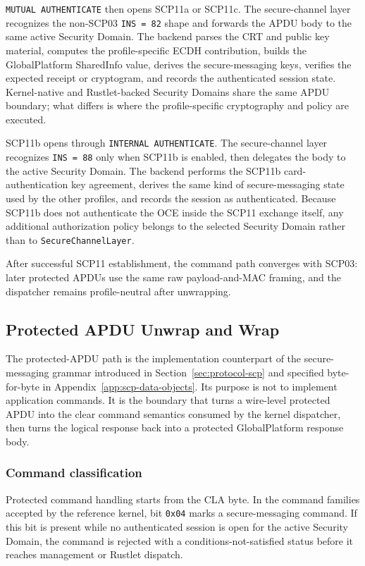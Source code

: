 \texttt{MUTUAL AUTHENTICATE} then opens SCP11a or SCP11c. The secure-channel
layer recognizes the non-SCP03 \texttt{INS = 82} shape and forwards the APDU
body to the same active Security Domain. The backend parses the CRT and public
key material, computes the profile-specific ECDH contribution, builds the
GlobalPlatform SharedInfo value, derives the secure-messaging keys, verifies
the expected receipt or cryptogram, and records the authenticated session
state. Kernel-native and Rustlet-backed Security Domains share the same APDU
boundary; what differs is where the profile-specific cryptography and policy
are executed.

SCP11b opens through \texttt{INTERNAL AUTHENTICATE}. The secure-channel layer
recognizes \texttt{INS = 88} only when SCP11b is enabled, then delegates the
body to the active Security Domain. The backend performs the SCP11b
card-authentication key agreement, derives the same kind of secure-messaging
state used by the other profiles, and records the session as authenticated.
Because SCP11b does not authenticate the OCE inside the SCP11 exchange itself,
any additional authorization policy belongs to the selected Security Domain
rather than to \texttt{SecureChannelLayer}.

After successful SCP11 establishment, the command path converges with SCP03:
later protected APDUs use the same raw payload-and-MAC framing, and the
dispatcher remains profile-neutral after unwrapping.

\subsection{Protected APDU Unwrap and Wrap}
\label{sec:impl-scp-ext}

The protected-APDU path is the implementation counterpart of the
secure-messaging grammar introduced in Section~\ref{sec:protocol-scp} and
specified byte-for-byte in Appendix~\ref{app:scp-data-objects}. Its purpose is
not to implement application commands. It is the boundary that turns a
wire-level protected APDU into the clear command semantics consumed by the
kernel dispatcher, then turns the logical response back into a protected
GlobalPlatform response body.

\subsubsection{Command classification}

Protected command handling starts from the CLA byte. In the command families
accepted by the reference kernel, bit \texttt{0x04} marks a
secure-messaging command. If this bit is present while no authenticated session
is open for the active Security Domain, the command is rejected with a
conditions-not-satisfied status before it reaches management or Rustlet
dispatch.

